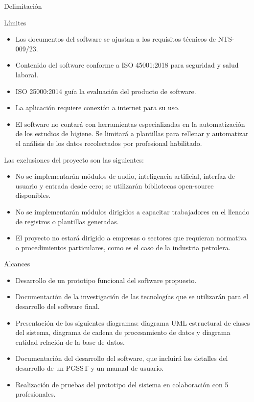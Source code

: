 \documentclass[spanish]{beamer} %
\begin{document}
\begin{frame}[allowframebreaks]{Delimitación}
  \begin{block}{Límites}
  \begin{itemize}
    \item Los documentos del software se ajustan a los requisitos técnicos de NTS-009/23.
    \item Contenido del software conforme a ISO 45001:2018 para seguridad y salud laboral.
    \item ISO 25000:2014 guía la evaluación del producto de software.
    \item La aplicación requiere conexión a internet para su uso.
    \item El software no contará con herramientas especializadas en la automatización de los estudios de higiene. Se limitará a plantillas para rellenar y automatizar el análisis de los datos recolectados por profesional habilitado.
  \end{itemize}
  \end{block}

  \framebreak
  Las exclusiones del proyecto son las siguientes:
  \begin{itemize}
	\item No se implementarán módulos de audio, inteligencia artificial, interfaz de usuario y entrada desde cero; se utilizarán bibliotecas open-source disponibles.
	\item No se implementarán módulos dirigidos a capacitar trabajadores en el llenado de registros o plantillas generadas.
	\item El proyecto no estará dirigido a empresas o sectores que requieran normativa o procedimientos particulares, como es el caso de la industria petrolera.
  \end{itemize}
  
  \framebreak
  \begin{block}{Alcances}
  \begin{itemize}
    \item Desarrollo de un prototipo funcional del software propuesto.
	  \item Documentación de la investigación de las tecnologías que se utilizarán para el desarrollo del software final.
	  \item Presentación de los siguientes diagramas: diagrama UML estructural de clases del sistema, diagrama de cadena de procesamiento de datos y diagrama entidad-relación de la base de datos.
	  \item Documentación del desarrollo del software, que incluirá los detalles del desarrollo de un PGSST y un manual de usuario.
	  \item Realización de pruebas del prototipo del sistema en colaboración con 5 profesionales.
  \end{itemize}
  \end{block}
\end{frame}
\end{document}
